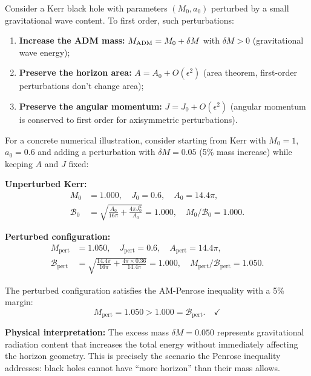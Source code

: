 \begin{example}\label{ex:perturbed-kerr}
Consider a Kerr black hole with parameters $(M_0, a_0)$ perturbed by a small gravitational wave content. To first order, such perturbations:
\begin{enumerate}[label=(\roman*)]
    \item \textbf{Increase the ADM mass:} $M_{\mathrm{ADM}} = M_0 + \delta M$ with $\delta M > 0$ (gravitational wave energy);
    \item \textbf{Preserve the horizon area:} $A = A_0 + O(\epsilon^2)$ (area theorem, first-order perturbations don't change area);
    \item \textbf{Preserve the angular momentum:} $J = J_0 + O(\epsilon^2)$ (angular momentum is conserved to first order for axisymmetric perturbations).
\end{enumerate}

For a concrete numerical illustration, consider starting from Kerr with $M_0 = 1$, $a_0 = 0.6$ and adding a perturbation with $\delta M = 0.05$ (5\% mass increase) while keeping $A$ and $J$ fixed:

\textbf{Unperturbed Kerr:}
\begin{align*}
M_0 &= 1.000, \quad J_0 = 0.6, \quad A_0 = 14.4\pi, \\
\mathcal{B}_0 &= \sqrt{\frac{A_0}{16\pi} + \frac{4\pi J_0^2}{A_0}} = 1.000, \quad M_0/\mathcal{B}_0 = 1.000.
\end{align*}

\textbf{Perturbed configuration:}
\begin{align*}
M_{\text{pert}} &= 1.050, \quad J_{\text{pert}} = 0.6, \quad A_{\text{pert}} = 14.4\pi, \\
\mathcal{B}_{\text{pert}} &= \sqrt{\frac{14.4\pi}{16\pi} + \frac{4\pi \times 0.36}{14.4\pi}} = 1.000, \quad M_{\text{pert}}/\mathcal{B}_{\text{pert}} = 1.050.
\end{align*}

The perturbed configuration satisfies the AM-Penrose inequality with a 5\% margin:
\[
M_{\text{pert}} = 1.050 > 1.000 = \mathcal{B}_{\text{pert}}. \quad \checkmark
\]

\textbf{Physical interpretation:} The excess mass $\delta M = 0.050$ represents gravitational radiation content that increases the total energy without immediately affecting the horizon geometry. This is precisely the scenario the Penrose inequality addresses: black holes cannot have ``more horizon'' than their mass allows.
\end{example}

